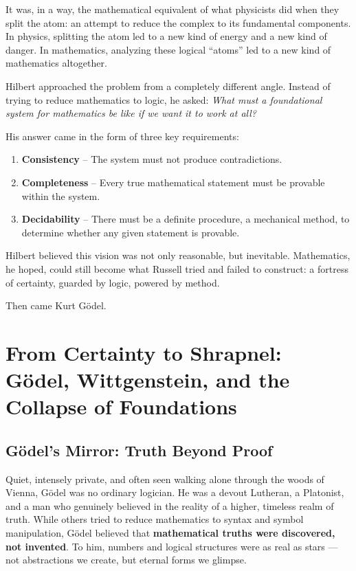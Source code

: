 It was, in a way, the mathematical equivalent of what physicists did when they split the atom: an attempt to reduce the complex to its fundamental components. In physics, splitting the atom led to a new kind of energy and a new kind of danger. In mathematics, analyzing these logical ``atoms'' led to a new kind of mathematics altogether.

Hilbert approached the problem from a completely different angle. Instead of trying to reduce mathematics to logic, he asked: \textit{What must a foundational system for mathematics be like if we want it to work at all?}

His answer came in the form of three key requirements:

\begin{enumerate}
    \item \textbf{Consistency} – The system must not produce contradictions.
    \item \textbf{Completeness} – Every true mathematical statement must be provable within the system.
    \item \textbf{Decidability} – There must be a definite procedure, a mechanical method, to determine whether any given statement is provable.
\end{enumerate}

Hilbert believed this vision was not only reasonable, but inevitable. Mathematics, he hoped, could still become what Russell tried and failed to construct: a fortress of certainty, guarded by logic, powered by method.

Then came Kurt Gödel.

\section{From Certainty to Shrapnel: Gödel, Wittgenstein, and the Collapse of Foundations}

\subsection{Gödel’s Mirror: Truth Beyond Proof}

Quiet, intensely private, and often seen walking alone through the woods of Vienna, Gödel was no ordinary logician. He was a devout Lutheran, a Platonist, and a man who genuinely believed in the reality of a higher, timeless realm of truth. While others tried to reduce mathematics to syntax and symbol manipulation, Gödel believed that \textbf{mathematical truths were discovered, not invented}. To him, numbers and logical structures were as real as stars — not abstractions we create, but eternal forms we glimpse.

